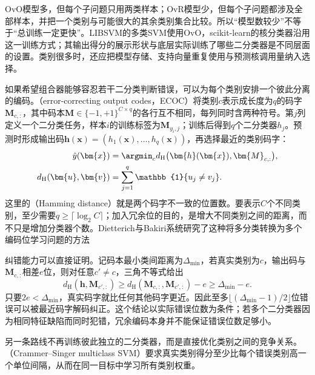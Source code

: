 OvO模型多，但每个子问题只用两类样本；OvR模型少，但每个子问题都涉及全部样本，并把一个类别与可能很大的其余类别集合比较。所以“模型数较少”不等于“总训练一定更快”。LIBSVM的多类SVM使用OvO，scikit-learn的核分类器沿用这一训练方式；其输出得分的展示形状与底层实际训练了哪些二分类器是不同层面的设置。类别很多时，还应把模型存储、支持向量重复使用与预测核调用量纳入选择。

如果希望组合器能够容忍若干二分类判断错误，可以为每个类别安排一个彼此分离的编码。（error-correcting output codes，ECOC）将类别$c$表示成长度为$q$的码字$\bm{M}_{c,:}$，其中码本$\bm{M}\in\{-1,+1\}^{C\times q}$的各行互不相同，每列同时含两种符号。第$j$列定义一个二分类任务，样本$i$的训练标签为$\bm{M}_{y_i,j}$；训练后得到$q$个二分类器$h_j$。预测时形成输出码$\bm{h}(\bm{x})=(h_1(\bm{x}),\ldots,h_q(\bm{x}))$，再选择最近的类别码字：
\begin{equation}
  \begin{aligned}
    \hat y(\bm{x})
      &=\argmin_c d_{\mathrm{H}}
          \bigl(\bm{h}(\bm{x}),\bm{M}_{c,:}\bigr),\\
    d_{\mathrm{H}}(\bm{u},\bm{v})
      &=\sum_{j=1}^q\mathbb{1}\{u_j\ne v_j\}.
  \end{aligned}
  \label{eq:classification-svm-ecoc}
\end{equation}
这里的（Hamming distance）就是两个码字不一致的位置数。要表示$C$个不同类别，至少需要$q\ge\lceil\log_2 C\rceil$；加入冗余位的目的，是增大不同类别之间的距离，而不只是增加分类器个数。Dietterich与Bakiri系统研究了这种将多分类转换为多个编码位学习问题的方法

纠错能力可以直接证明。记码本最小类间距离为$\Delta_{\min}$，若真实类别为$c$，输出码与$\bm{M}_{c,:}$相差$e$位，则对任意$c'\ne c$，三角不等式给出
\[
  d_{\mathrm{H}}(\bm{h},\bm{M}_{c',:})
  \ge d_{\mathrm{H}}(\bm{M}_{c,:},\bm{M}_{c',:})-e
  \ge\Delta_{\min}-e.
\]
只要$2e<\Delta_{\min}$，真实码字就比任何其他码字更近。因此至多$\lfloor(\Delta_{\min}-1)/2\rfloor$位错误可以被最近码字解码纠正。这个结论以实际错误位数为条件；若多个二分类器因为相同特征缺陷而同时犯错，冗余编码本身并不能保证错误位数足够小。

另一条路线不再训练彼此独立的二分类器，而是直接优化类别之间的竞争关系。（Crammer--Singer multiclass SVM）要求真实类别得分至少比每个错误类别高一个单位间隔，从而在同一目标中学习所有类别权重。

